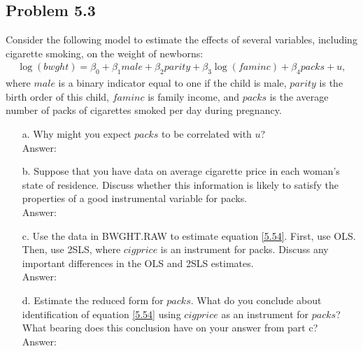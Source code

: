 \documentclass[10pt]{article}
\begin{document}
\subsection*{Problem 5.3}
Consider the following model to estimate the effects of several variables, including cigarette smoking, on the weight of newborns:
\begin{align}
    \log(bwght)=\beta_0+\beta_1male+\beta_2parity+\beta_3\log(faminc)+\beta_4packs+u, \tag{5.54}\label{5.54}
\end{align}
where $male$ is a binary indicator equal to one if the child is male, $parity$ is the birth order of this child, $faminc$ is family income, and $packs$ is the average number of packs of cigarettes smoked per day during pregnancy.
\begin{enumerate}
\item[a.] Why might you expect $packs$ to be correlated with $u$?
\\ Answer:\\

\item[b.] Suppose that you have data on average cigarette price in each woman's state of residence. Discuss whether this information is likely to satisfy the properties of a good instrumental variable for packs.
\\ Answer:\\

\item[c.] Use the data in BWGHT.RAW to estimate equation \eqref{5.54}. First, use OLS. Then, use 2SLS, where $cigprice$ is an instrument for packs. Discuss any important differences in the OLS and 2SLS estimates.
\\ Answer:\\

\item[d.] Estimate the reduced form for $packs$. What do you conclude about identification of equation \eqref{5.54} using $cigprice$ as an instrument for $packs$? What bearing does this conclusion have on your answer from part c?
\\ Answer:\\
\end{enumerate}
\end{document}

